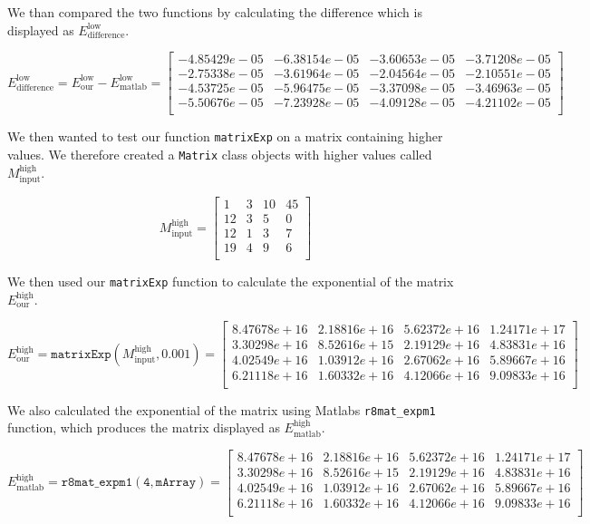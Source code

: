 \documentclass[paper=a4, fontsize=11pt]{article} %
\begin{document}
We than compared the two functions by calculating the difference which
is displayed as $E_{\text{difference}}^{\text{low}}$.


\[
  E_{\text{difference}}^{\text{low}} = E_{\text{our}}^{\text{low}} - E_{\text{matlab}}^{\text{low}} =
  \begin{bmatrix}
    -4.85429e-05 & -6.38154e-05 & -3.60653e-05 & -3.71208e-05 \\
    -2.75338e-05 & -3.61964e-05 & -2.04564e-05 & -2.10551e-05 \\
    -4.53725e-05 & -5.96475e-05 & -3.37098e-05 & -3.46963e-05 \\
    -5.50676e-05 & -7.23928e-05 & -4.09128e-05 & -4.21102e-05 \\
  \end{bmatrix}
\]

We then wanted to test our function \texttt{matrixExp} on a matrix
containing higher values. We therefore created a \texttt{Matrix} class
objects with higher values called $M_{\text{input}}^{\text{high}}$.

\[
M_{\text{input}}^{\text{high}}=
  \begin{bmatrix}
    1 & 3 & 10 & 45 \\
    12 & 3 & 5 & 0 \\
    12 & 1 & 3 & 7 \\
    19 & 4 & 9 & 6 \\
  \end{bmatrix}
\]

We then used our \texttt{matrixExp} function to calculate the
exponential of the matrix $E_{\text{our}}^{\text{high}}$.

\[
E_{\text{our}}^{\text{high}} = \mathtt{matrixExp}(M_{\text{input}}^{\text{high}},0.001) =
  \begin{bmatrix}
 8.47678e+16 & 2.18816e+16 & 5.62372e+16 & 1.24171e+17 \\
 3.30298e+16 & 8.52616e+15 & 2.19129e+16 & 4.83831e+16 \\
 4.02549e+16 & 1.03912e+16 & 2.67062e+16 & 5.89667e+16 \\
 6.21118e+16 & 1.60332e+16 & 4.12066e+16 & 9.09833e+16 \\
  \end{bmatrix}
\]

We also calculated the exponential of the matrix using Matlabs
\texttt{r8mat\_{expm1}} function, which produces the matrix displayed
as $E_{\text{matlab}}^{\text{high}}$.

\[
E_{\text{matlab}}^{\text{high}} = \mathtt{r8mat\_{expm1}(4, mArray)} =
  \begin{bmatrix}
 8.47678e+16 & 2.18816e+16 & 5.62372e+16 & 1.24171e+17 \\
 3.30298e+16 & 8.52616e+15 & 2.19129e+16 & 4.83831e+16 \\
 4.02549e+16 & 1.03912e+16 & 2.67062e+16 & 5.89667e+16 \\
 6.21118e+16 & 1.60332e+16 & 4.12066e+16 & 9.09833e+16 \\
  \end{bmatrix}
\]
\end{document}
